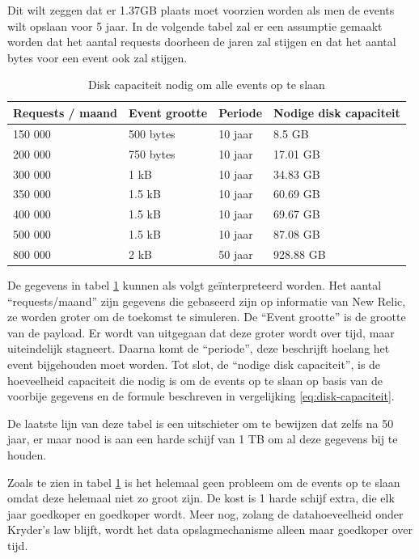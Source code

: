 Dit wilt zeggen dat er 1.37GB plaats moet voorzien worden als men de events wilt opslaan voor 5 jaar. In de volgende tabel zal er een assumptie gemaakt worden dat het aantal requests doorheen de jaren zal stijgen en dat het aantal bytes voor een event ook zal stijgen.

\begin{table}[h]
\centering
\caption[Disk capaciteit nodig om alle events op te slaan]{Disk capaciteit nodig om alle events op te slaan\footnotemark}
\begin{tabular}{@{}llll@{}}
\toprule
Requests / maand & Event grootte & Periode & Nodige disk capaciteit \\ \midrule
150 000 & 500 bytes & 10 jaar & 8.5 GB \\
200 000 & 750 bytes & 10 jaar & 17.01 GB \\
300 000 & 1 kB & 10 jaar & 34.83 GB \\
350 000 & 1.5 kB & 10 jaar & 60.69 GB \\
400 000 & 1.5 kB & 10 jaar & 69.67 GB \\
500 000 & 1.5 kB & 10 jaar & 87.08 GB \\ \midrule
800 000 & 2 kB & 50 jaar & 928.88 GB \\ \bottomrule
\end{tabular}
\label{disk-capaciteit}
\end{table}


De gegevens in tabel \ref{disk-capaciteit} kunnen als volgt geïnterpreteerd worden. Het aantal ``requests/maand'' zijn gegevens die gebaseerd zijn op informatie van New Relic, ze worden groter om de toekomst te simuleren. De ``Event grootte'' is de grootte van de \gls{payload}. Er wordt van uitgegaan dat deze groter wordt over tijd, maar uiteindelijk stagneert. Daarna komt de ``periode'', deze beschrijft hoelang het event bijgehouden moet worden. Tot slot, de ``nodige disk capaciteit'', is de hoeveelheid capaciteit die nodig is om de events op te slaan op basis van de voorbije gegevens en de formule beschreven in vergelijking \ref{eq:disk-capaciteit}.

De laatste lijn van deze tabel is een uitschieter om te bewijzen dat zelfs na 50 jaar, er maar nood is aan een harde schijf van 1 TB om al deze gegevens bij te houden.

Zoals te zien in tabel \ref{disk-capaciteit} is het helemaal geen probleem om de events op te slaan omdat deze helemaal niet zo groot zijn. De kost is 1 harde schijf extra, die elk jaar goedkoper en goedkoper wordt. Meer nog, zolang de datahoeveelheid onder Kryder’s law blijft, wordt het data opslagmechanisme alleen maar goedkoper over tijd.


